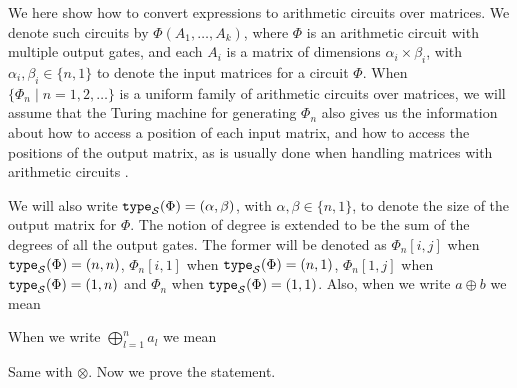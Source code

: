 We here show how to convert \langfor expressions to arithmetic circuits over matrices.
We denote such circuits by $\Phi(A_1,\ldots ,A_k)$, where $\Phi$ is an arithmetic circuit 
with multiple output gates, and each  $A_i$ is a matrix of dimensions $\alpha_i\times \beta_i$, 
with $\alpha_i,\beta_i \in \{n,1\}$ to denote the input matrices for a circuit $\Phi$. 
When $\{\Phi_n\mid n=1,2,\ldots\}$ is a uniform family of 
arithmetic circuits over matrices, we will assume that the Turing machine for generating $\Phi_n$ also 
gives us the information about how to access a position of each input matrix, and how to access the 
positions of the output matrix, as is usually done when handling matrices with arithmetic 
circuits \cite{Raz02}. 

We will also write $\texttt{type}_{\mathcal{S}}(\Phi)=(\alpha,\beta)$, with 
$\alpha,\beta\in \{n,1\}$, to denote the size of the output matrix for $\Phi$. 
The notion of degree is extended to be the sum of the degrees of all 
the output gates. The former will be denoted as $\Phi_{n}[i,j]$ when $\texttt{type}_{\mathcal{S}}(\Phi)=(n,n)$, 
$\Phi_{n}[i,1]$ when $\texttt{type}_{\mathcal{S}}(\Phi)=(n,1)$, $\Phi_{n}[1,j]$ when $\texttt{type}_{\mathcal{S}}(\Phi)=(1,n)$ and 
$\Phi_{n}$ when $\texttt{type}_{\mathcal{S}}(\Phi)=(1,1)$. Also, when we write $a \oplus b$ we mean 

\begin{center}
\end{center}
When we write $\bigoplus_{l=1}^n a_l$ we mean 

\begin{center}
\end{center}
Same with $\otimes$. Now we prove the statement.



